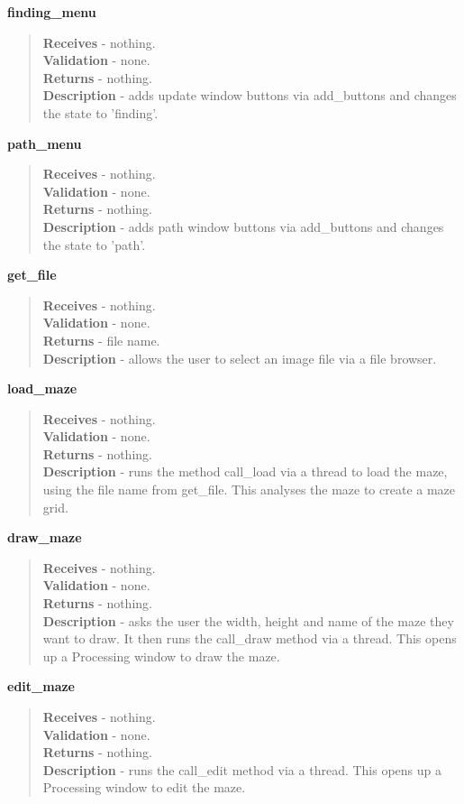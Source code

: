 \documentclass[titlepage]{article}
\begin{document}
\textbf{finding\_menu}
\begin{quote}
\textbf{Receives} - nothing. \\
\textbf{Validation} - none.\\
\textbf{Returns} - nothing. \\
\textbf{Description} - adds update window buttons via add\_buttons and changes the state to 'finding'.
\end{quote}

\textbf{path\_menu}
\begin{quote}
\textbf{Receives} - nothing. \\
\textbf{Validation} - none.\\
\textbf{Returns} - nothing. \\
\textbf{Description} - adds path window buttons via add\_buttons and changes the state to 'path'.
\end{quote}

\textbf{get\_file}
\begin{quote}
\textbf{Receives} - nothing. \\
\textbf{Validation} - none.\\
\textbf{Returns} - file name. \\
\textbf{Description} - allows the user to select an image file via a file browser.
\end{quote}

\textbf{load\_maze}
\begin{quote}
\textbf{Receives} - nothing. \\
\textbf{Validation} - none.\\
\textbf{Returns} - nothing. \\
\textbf{Description} - runs the method call\_load via a thread to load the maze, using the file name from get\_file. This analyses the maze to create a maze grid.
\end{quote}

\textbf{draw\_maze}
\begin{quote}
\textbf{Receives} - nothing. \\
\textbf{Validation} - none.\\
\textbf{Returns} - nothing. \\
\textbf{Description} - asks the user the width, height and name of the maze they want to draw. It then runs the call\_draw method via a thread. This opens up a Processing window to draw the maze.
\end{quote}

\textbf{edit\_maze}
\begin{quote}
\textbf{Receives} - nothing. \\
\textbf{Validation} - none.\\
\textbf{Returns} - nothing. \\
\textbf{Description} - runs the call\_edit method via a thread. This opens up a Processing window to edit the maze.
\end{quote}
\end{document}
